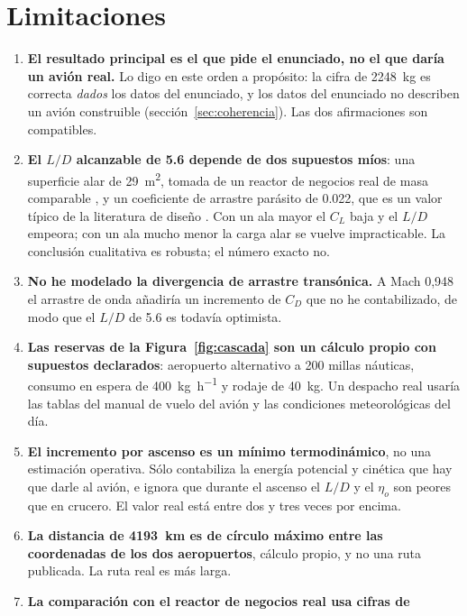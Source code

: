 \documentclass[11pt,letterpaper]{article}
\begin{document}
\section{Limitaciones}

\begin{enumerate}
\item \textbf{El resultado principal es el que pide el enunciado, no el que
  daría un avión real.} Lo digo en este orden a propósito: la cifra de
  \SI{2248}{\kilogram} es correcta \emph{dados} los datos del enunciado, y los
  datos del enunciado no describen un avión construible
  (sección~\ref{sec:coherencia}). Las dos afirmaciones son compatibles.
\item \textbf{El \(L/D\) alcanzable de \num{5.6} depende de dos supuestos
  míos}: una superficie alar de \SI{29}{\meter\squared}, tomada de un reactor
  de negocios real de masa comparable \parencite{learjet75}, y un coeficiente
  de arrastre parásito de \num{0.022}, que es un valor típico de la literatura
  de diseño \parencite{anderson1999,raymer2018}. Con un ala mayor el \(C_L\)
  baja y el \(L/D\) empeora; con un ala mucho menor la carga alar se vuelve
  impracticable. La conclusión cualitativa es robusta; el número exacto no.
\item \textbf{No he modelado la divergencia de arrastre transónica.} A Mach
  0,948 el arrastre de onda añadiría un incremento de \(C_D\) que no he
  contabilizado, de modo que el \(L/D\) de \num{5.6} es todavía optimista.
\item \textbf{Las reservas de la Figura~\ref{fig:cascada} son un cálculo
  propio con supuestos declarados}: aeropuerto alternativo a
  \num{200} millas náuticas, consumo en espera de
  \SI{400}{\kilogram\per\hour} y rodaje de \SI{40}{\kilogram}. Un despacho real
  usaría las tablas del manual de vuelo del avión y las condiciones
  meteorológicas del día.
\item \textbf{El incremento por ascenso es un mínimo termodinámico}, no una
  estimación operativa. Sólo contabiliza la energía potencial y cinética que hay
  que darle al avión, e ignora que durante el ascenso el \(L/D\) y el
  \(\eta_o\) son peores que en crucero. El valor real está entre dos y tres
  veces por encima.
\item \textbf{La distancia de \SI{4193}{\kilo\meter} es de círculo máximo entre
  las coordenadas de los dos aeropuertos}, cálculo propio, y no una ruta
  publicada. La ruta real es más larga.
\item \textbf{La comparación con el reactor de negocios real usa cifras de
}
\end{enumerate}
\end{document}

